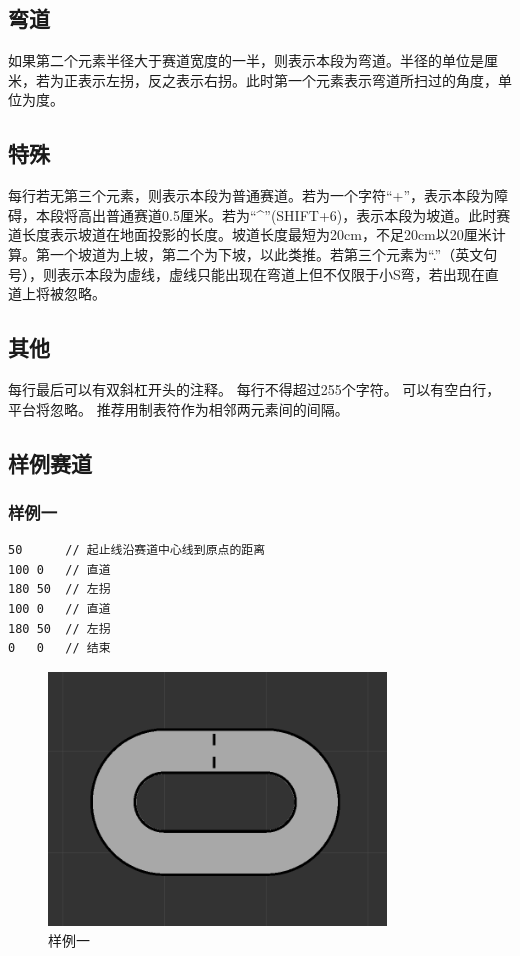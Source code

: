 \documentclass[titlepage,a4paper]{ctexart}
\begin{document}
\subsection{弯道}
如果第二个元素半径大于赛道宽度的一半，则表示本段为弯道。半径的单位是厘米，若为正表示左拐，反之表示右拐。此时第一个元素表示弯道所扫过的角度，单位为度。
\subsection{特殊}
每行若无第三个元素，则表示本段为普通赛道。若为一个字符“+”，表示本段为障碍，本段将高出普通赛道0.5厘米。若为“\textasciicircum”(SHIFT+6)，表示本段为坡道。此时赛道长度表示坡道在地面投影的长度。坡道长度最短为20cm，不足20cm以20厘米计算。第一个坡道为上坡，第二个为下坡，以此类推。若第三个元素为“.”（英文句号），则表示本段为虚线，虚线只能出现在弯道上但不仅限于小S弯，若出现在直道上将被忽略。
\subsection{其他}
每行最后可以有双斜杠开头的注释。
每行不得超过255个字符。
可以有空白行，平台将忽略。
推荐用制表符作为相邻两元素间的间隔。
\subsection{样例赛道}
\subsubsection{样例一}
\begin{lstlisting}
50		// 起止线沿赛道中心线到原点的距离
100	0	// 直道
180	50	// 左拐
100	0	// 直道
180	50	// 左拐
0	0	// 结束
\end{lstlisting}
\begin{figure}[!htbp]
\centering
\includegraphics[width=0.80\textwidth]{demo1.png}
\caption{样例一}
\end{figure}
\newpage
\end{document}

